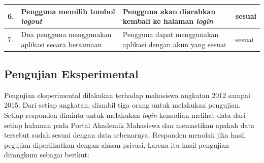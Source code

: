 \begin{table}[H]
\begin{tabular}{|p{0.25cm}| p{3.5cm}| p{7cm}| p{2.5cm}|}
				6.	&	Pengguna memilih tombol \textit{logout}	&	Pengguna akan diarahkan kembali ke halaman \textit{login} &	sesuai	\\ \hline
				7.	& Dua pengguna menggunakan aplikasi secara bersamaan	&	Pengguna dapat menggunakan aplikasi dengan akun yang sesuai &	sesuai	\\ \hline
				\end{tabular}
				\label{table:hasilFungsional}
			\end{table}
			
		\subsection{Pengujian Eksperimental} 
		Pengujian eksperimental dilakukan terhadap mahasiswa angkatan 2012 sampai 2015. Dari setiap angkatan, diambil tiga orang untuk melakukan pengujian. Setiap responden diminta untuk melakukan \textit{login} kemudian melihat data dari setiap halaman pada Portal Akademik Mahasiswa dan memastikan apakah data tersebut sudah sesuai dengan data sebenarnya. Responden menolak jika hasil pegujian diperlihatkan dengan alasan privasi, karena itu hasil pengujian dirangkum sebagai berikut:
